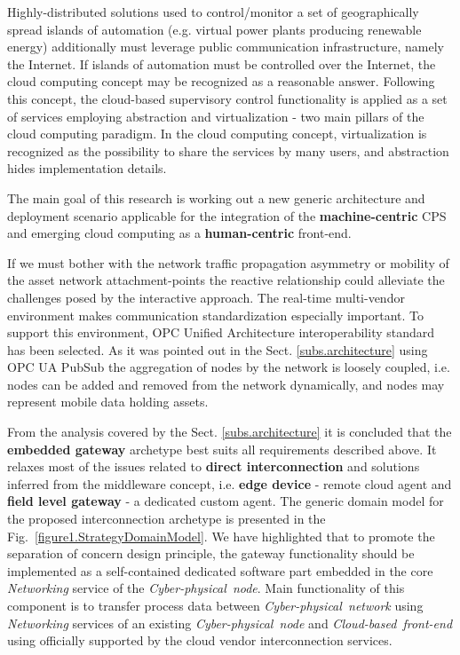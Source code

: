 \documentclass{jacsart}
\begin{document}
Highly-distributed solutions used to control/monitor a set of geographically spread islands of automation (e.g. virtual power plants producing renewable energy) additionally must leverage public communication infrastructure, namely the Internet. If islands of automation must be controlled over the Internet, the cloud computing concept may be recognized as a reasonable answer. Following this concept, the cloud-based supervisory control functionality is applied as a set of services employing abstraction and virtualization - two main pillars of the cloud computing paradigm. In the cloud computing concept, virtualization is recognized as the possibility to share the services by many users, and abstraction hides implementation details.

The main goal of this research is working out a new generic architecture and deployment scenario applicable for the integration of the \textbf{machine-centric} CPS and emerging cloud computing as a \textbf{human-centric} front-end.

If we must bother with the network traffic propagation asymmetry or mobility of the asset network attachment-points the reactive relationship\cite{mpostol2020} could alleviate the challenges posed by the interactive approach. The real-time multi-vendor environment makes communication standardization especially important. To support this environment, OPC Unified Architecture \cite{RefWorks:doc:5ac86c98e4b009947bbb874c} interoperability standard has been selected. As it was pointed out in the Sect. \ref*{subs.architecture} using OPC UA PubSub \cite{RefWorks:doc:5d98837de4b055984c0eecf0} the aggregation of nodes by the network is loosely coupled, i.e. nodes can be added and removed from the network dynamically, and nodes may represent mobile data holding assets.

From the analysis covered by the Sect. \ref*{subs.architecture} it is concluded that the \textbf{embedded gateway} archetype best suits all requirements described above. It relaxes most of the issues related to \textbf{direct interconnection} and solutions inferred from the middleware concept, i.e. \textbf{edge device} - remote cloud agent and \textbf{field level gateway} - a dedicated custom agent. The generic domain model for the proposed interconnection archetype is presented in the Fig.~\ref*{figure1.StrategyDomainModel}. We have highlighted that to promote the separation of concern design principle, the gateway functionality should be implemented as a self-contained dedicated software part embedded in the core \textit{Networking} service of the \textit{Cyber-physical\ node}. Main functionality of this component is to transfer process data between \textit{Cyber-physical\ network} using \textit{Networking} services of an existing \textit{Cyber-physical\ node} and \textit{Cloud-based\ front-end} using officially supported by the cloud vendor interconnection services.
\end{document}
